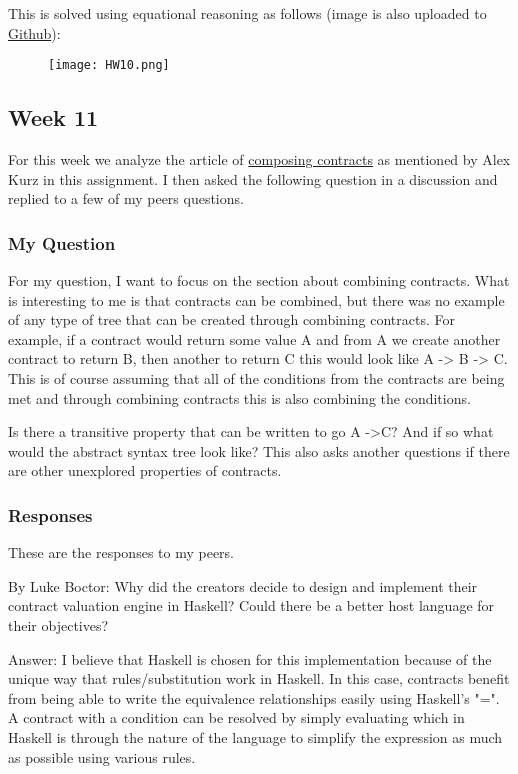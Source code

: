 \documentclass{article}
\theoremstyle{theorem}
\theoremstyle{definition}
\theoremstyle{remark}
\begin{document}
This is solved using equational reasoning as follows (image is also uploaded to \href{https://github.com/dapak2002/Pak-D-CPSC-354-Report/blob/main/src/HW10.jpeg}{Github}):

\begin{figure}[htp]
    \centering
    \texttt{[image: HW10.png]}
\end{figure}

\subsection{Week 11}
For this week we analyze the article of \href{https://hackmd.io/@alexhkurz/rJ9O5tZSo}{composing contracts} as mentioned by Alex Kurz in this assignment. I then asked the following question in a discussion and replied to a few of my peers questions.

\subsubsection{My Question}
For my question, I want to focus on the section about combining contracts. What is interesting to me is that contracts can be combined, but there was no example of any type of tree that can be created through combining contracts. For example, if a contract would return some value A and from A we create another contract to return B, then another to return C this would look like A -> B -> C. This is of course assuming that all of the conditions from the contracts are being met and through combining contracts this is also combining the conditions.

Is there a transitive property that can be written to go A ->C? And if so what would the abstract syntax tree look like? This also asks another questions if there are other unexplored properties of contracts.

\subsubsection{Responses}
These are the responses to my peers.

\medskip
By Luke Boctor: Why did the creators decide to design and implement their contract valuation engine in Haskell? Could there be a better host language for their objectives?

\medskip
Answer: I believe that Haskell is chosen for this implementation because of the unique way that rules/substitution work in Haskell. In this case, contracts benefit from being able to write the equivalence relationships easily using Haskell's "=".  A contract with a condition can be resolved by simply evaluating which in Haskell is through the nature of the language to simplify the expression as much as possible using various rules. 
\end{document}
